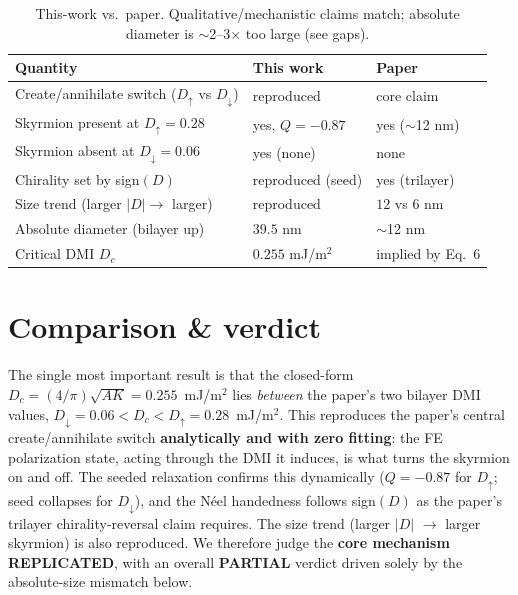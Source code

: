 \documentclass[11pt]{article}
\begin{document}
\begin{table}[h]
\centering
\begin{tabular}{lll}
\toprule
Quantity & This work & Paper \\
\midrule
Create/annihilate switch ($D_\uparrow$ vs $D_\downarrow$) & reproduced & core claim \\
Skyrmion present at $D_\uparrow=0.28$ & yes, $Q=-0.87$ & yes ($\sim$12 nm) \\
Skyrmion absent at $D_\downarrow=0.06$ & yes (none) & none \\
Chirality set by sign$(D)$ & reproduced (seed) & yes (trilayer) \\
Size trend (larger $|D|\to$ larger) & reproduced & $12$ vs $6$ nm \\
Absolute diameter (bilayer up) & $39.5$ nm & $\sim$12 nm \\
Critical DMI $D_c$ & $0.255$ mJ/m$^2$ & implied by Eq.~6 \\
\bottomrule
\end{tabular}
\caption{This-work vs.\ paper. Qualitative/mechanistic claims match; absolute
diameter is $\sim$2--3$\times$ too large (see gaps).}
\end{table}

\section{Comparison \& verdict}
The single most important result is that the closed-form
$D_c=(4/\pi)\sqrt{AK}=0.255$~mJ/m$^2$ lies \emph{between} the paper's two
bilayer DMI values, $D_\downarrow=0.06 < D_c < D_\uparrow=0.28$~mJ/m$^2$. This
reproduces the paper's central create/annihilate switch \textbf{analytically and
with zero fitting}: the FE polarization state, acting through the DMI it
induces, is what turns the skyrmion on and off. The seeded relaxation confirms
this dynamically ($Q=-0.87$ for $D_\uparrow$; seed collapses for $D_\downarrow$),
and the N\'eel handedness follows sign$(D)$ as the paper's trilayer
chirality-reversal claim requires. The size trend (larger $|D|$ $\to$ larger
skyrmion) is also reproduced. We therefore judge the \textbf{core mechanism
REPLICATED}, with an overall \textbf{PARTIAL} verdict driven solely by the
absolute-size mismatch below.
\end{document}
